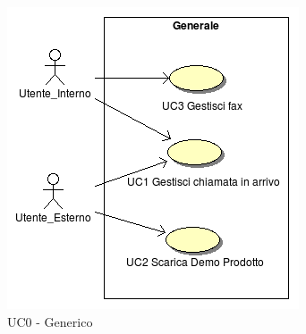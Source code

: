 \begin{figure}[!ht]
\centering
 \includegraphics[scale=0.8]{./images/UC0_Generale.png}
\caption{UC0 - Generico}
\label{UC0}
\end{figure}

\newpage
